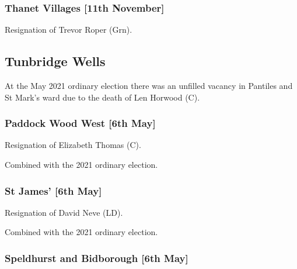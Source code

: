 \documentclass[a4paper,openany]{book}
\begin{document}
\begin{resultsiii}
\subsubsection*{Thanet Villages \hspace*{\fill}\nolinebreak[1]%
	\enspace\hspace*{\fill}
	[11th November]}


Resignation of Trevor Roper (Grn).

\subsection*{Tunbridge Wells}

At the May 2021 ordinary election there was an unfilled vacancy in Pantiles and St Mark's ward due to the death of Len Horwood (C).

\subsubsection*{Paddock Wood West \hspace*{\fill}\nolinebreak[1]%
	\enspace\hspace*{\fill}
	[6th May]}


Resignation of Elizabeth Thomas (C).

Combined with the 2021 ordinary election.

\subsubsection*{St James' \hspace*{\fill}\nolinebreak[1]%
	\enspace\hspace*{\fill}
	[6th May]}


Resignation of David Neve (LD).

Combined with the 2021 ordinary election.

\subsubsection*{Speldhurst and Bidborough \hspace*{\fill}\nolinebreak[1]%
	\enspace\hspace*{\fill}
	[6th May]}


\end{resultsiii}
\end{document}
